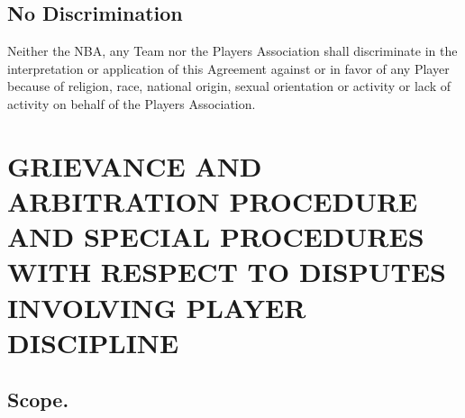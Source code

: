 \documentclass[
]{book}
\begin{document}
\hypertarget{no-discrimination}{%
\section{No Discrimination}\label{no-discrimination}}

Neither the NBA, any Team nor the Players Association shall discriminate in the interpretation or application of this Agreement against or in favor of any Player because of religion, race, national origin, sexual orientation or activity or lack of activity on behalf of the Players Association.

\hypertarget{grievance-and-arbitration-procedure-and-special-procedures-with-respect-to-disputes-involving-player-discipline}{%
\chapter{GRIEVANCE AND ARBITRATION PROCEDURE AND SPECIAL PROCEDURES WITH RESPECT TO DISPUTES INVOLVING PLAYER DISCIPLINE}\label{grievance-and-arbitration-procedure-and-special-procedures-with-respect-to-disputes-involving-player-discipline}}


\hypertarget{scope.}{%
\section{Scope.}\label{scope.}}
\end{document}
